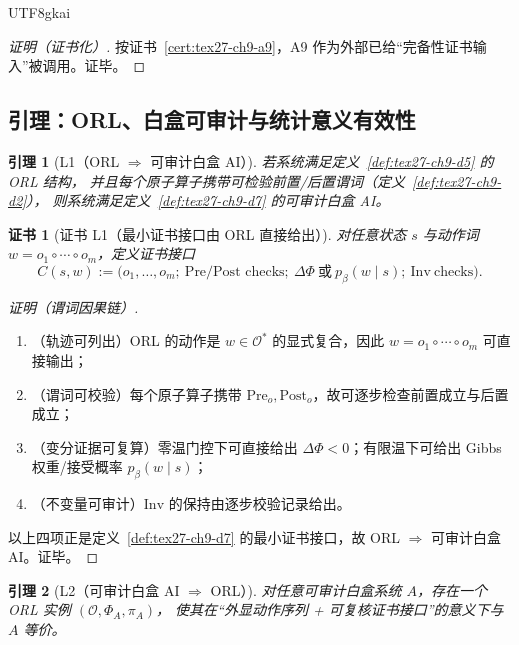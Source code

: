 \documentclass[12pt]{article}
\newtheorem{lemma}{引理}[section]
\newtheorem{Certificate}{证书}[section]
\begin{document}
\begin{CJK*}{UTF8}{gkai}
\begin{proof}[证明（证书化）]
按证书~\ref{cert:tex27-ch9-a9}，A9 作为外部已给“完备性证书输入”被调用。证毕。
\end{proof}

\subsection{引理：ORL、白盒可审计与统计意义有效性}
\label{subsec:tex27-ch9-lemmas}

\begin{lemma}[L1（ORL $\Rightarrow$ 可审计白盒 AI）]
\label{lem:tex27-ch9-l1}
若系统满足定义~\ref{def:tex27-ch9-d5} 的 ORL 结构，
并且每个原子算子携带可检验前置/后置谓词（定义~\ref{def:tex27-ch9-d2}），
则系统满足定义~\ref{def:tex27-ch9-d7} 的可审计白盒 AI。
\end{lemma}

\begin{Certificate}[证书 L1（最小证书接口由 ORL 直接给出）]
\label{cert:tex27-ch9-l1}
对任意状态 $s$ 与动作词 $w=o_1\circ\cdots\circ o_m$，定义证书接口
\[
  C(s,w):=\bigl(o_1,\dots,o_m;\ \text{Pre/Post checks};\ \Delta\Phi\ \text{或}\ p_\beta(w\mid s);\ \mathrm{Inv\ checks}
    \bigr).
\]
\end{Certificate}

\begin{proof}[证明（谓词因果链）]
\begin{enumerate}
  \item（轨迹可列出）ORL 的动作是 $w\in\mathcal{O}^*$ 的显式复合，因此 $w=o_1\circ\cdots\circ o_m$ 可直接输出；
  \item（谓词可校验）每个原子算子携带 $\mathrm{Pre}_o,\mathrm{Post}_o$，故可逐步检查前置成立与后置成立；
  \item（变分证据可复算）零温门控下可直接给出 $\Delta\Phi<0$；有限温下可给出 Gibbs 权重/接受概率 $p_\beta(w\mid s)$；
  \item（不变量可审计）$\mathrm{Inv}$ 的保持由逐步校验记录给出。
\end{enumerate}
以上四项正是定义~\ref{def:tex27-ch9-d7} 的最小证书接口，故 ORL $\Rightarrow$ 可审计白盒 AI。证毕。
\end{proof}

\begin{lemma}[L2（可审计白盒 AI $\Rightarrow$ ORL）]
\label{lem:tex27-ch9-l2}
对任意可审计白盒系统 $A$，存在一个 ORL 实例 $(\mathcal{O},\Phi_A,\pi_A)$，
使其在“外显动作序列 + 可复核证书接口”的意义下与 $A$ 等价。
\end{lemma}


\end{CJK*}
\end{document}
